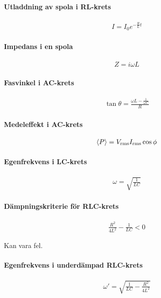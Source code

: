 \paragraph{Utladdning av spola i RL-krets}
\begin{align*}
	I = I_0e^{-\frac{R}{L}t}
\end{align*}

\paragraph{Impedans i en spola}
\begin{align*}
	Z = i\omega L
\end{align*}

\paragraph{Fasvinkel i AC-krets}
\begin{align*}
	\tan{\theta} = \frac{\omega L - \frac{1}{\omega C}}{R}
\end{align*}

\paragraph{Medeleffekt i AC-krets}
\begin{align*}
	\expval{P} = V_{\text{rms}}I_{\text{rms}}\cos{\phi}
\end{align*}

\paragraph{Egenfrekvens i LC-krets}
\begin{align*}
	\omega = \sqrt{\frac{1}{LC}}
\end{align*}

\paragraph{Dämpningskriterie för RLC-krets}
\begin{align*}
	\frac{R^2}{4L^2} - \frac{1}{LC} < 0
\end{align*}

\deriv
Kan vara fel.

\paragraph{Egenfrekvens i underdämpad RLC-krets}
\begin{align*}
	\omega ' = \sqrt{\frac{1}{LC} - \frac{R^2}{4L^2}}
\end{align*}

